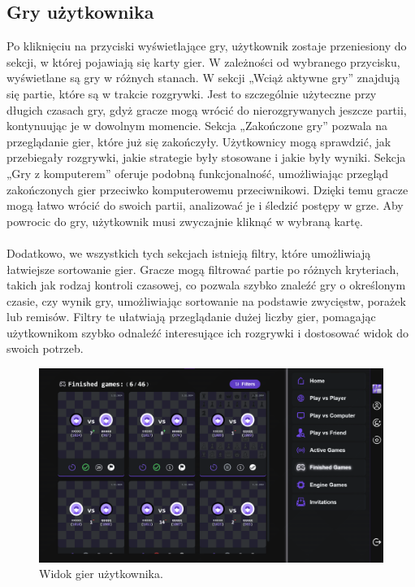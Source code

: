 \documentclass[12pt,a4paper]{article}
\begin{document}
\newpage
\subsection{Gry użytkownika}
Po kliknięciu na przyciski wyświetlające gry, użytkownik zostaje przeniesiony do sekcji, w której pojawiają się karty gier. W zależności od wybranego przycisku, wyświetlane są gry w różnych stanach. W sekcji „Wciąż aktywne gry” znajdują się partie, które są w trakcie rozgrywki. Jest to szczególnie użyteczne przy długich czasach gry, gdyż gracze mogą wrócić do nierozgrywanych jeszcze partii, kontynuując je w dowolnym momencie. Sekcja „Zakończone gry” pozwala na przeglądanie gier, które już się zakończyły. Użytkownicy mogą sprawdzić, jak przebiegały rozgrywki, jakie strategie były stosowane i jakie były wyniki. Sekcja „Gry z komputerem” oferuje podobną funkcjonalność, umożliwiając przegląd zakończonych gier przeciwko komputerowemu przeciwnikowi. Dzięki temu gracze mogą łatwo wrócić do swoich partii, analizować je i śledzić postępy w grze. Aby powrocic do gry, użytkownik musi zwyczajnie kliknąć w wybraną kartę.
\\\\
Dodatkowo, we wszystkich tych sekcjach istnieją filtry, które umożliwiają łatwiejsze sortowanie gier. Gracze mogą filtrować partie po różnych kryteriach, takich jak rodzaj kontroli czasowej, co pozwala szybko znaleźć gry o określonym czasie, czy wynik gry, umożliwiając sortowanie na podstawie zwycięstw, porażek lub remisów. Filtry te ułatwiają przeglądanie dużej liczby gier, pomagając użytkownikom szybko odnaleźć interesujące ich rozgrywki i dostosować widok do swoich potrzeb.


\begin{figure}[h!]
    \centering
    \includegraphics[width=1\textwidth]{zdj/ins_min_games.png}
    \caption{Widok gier użytkownika.}
\end{figure}
\end{document}
